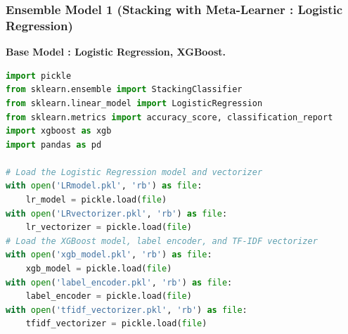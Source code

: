 \subsubsection{Ensemble Model 1 (Stacking with Meta-Learner : Logistic Regression)}
\noindent
\textbf{Base Model : Logistic Regression, XGBoost. }

\begin{tcolorbox}[colback=gray!5!white, colframe=gray!80!black, boxrule=0.5pt, title=Ensemble Model 1 : Loading and Preprocessing]
    \begin{lstlisting}[language=Python]
import pickle
from sklearn.ensemble import StackingClassifier
from sklearn.linear_model import LogisticRegression
from sklearn.metrics import accuracy_score, classification_report
import xgboost as xgb
import pandas as pd

# Load the Logistic Regression model and vectorizer
with open('LRmodel.pkl', 'rb') as file:
    lr_model = pickle.load(file)
with open('LRvectorizer.pkl', 'rb') as file:
    lr_vectorizer = pickle.load(file)
# Load the XGBoost model, label encoder, and TF-IDF vectorizer
with open('xgb_model.pkl', 'rb') as file:
    xgb_model = pickle.load(file)
with open('label_encoder.pkl', 'rb') as file:
    label_encoder = pickle.load(file)
with open('tfidf_vectorizer.pkl', 'rb') as file:
    tfidf_vectorizer = pickle.load(file)
    \end{lstlisting}
\end{tcolorbox}

